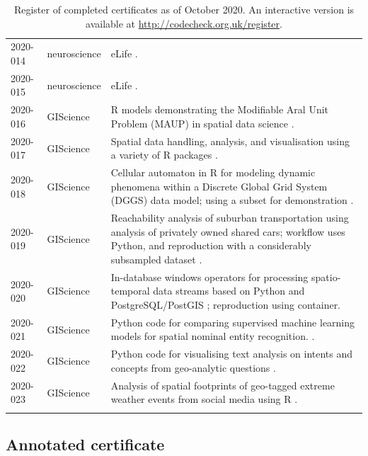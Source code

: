\documentclass[12pt]{article}
\begin{document}
\begin{table}
\begin{tabular}{llp{11cm}}
    2020-014  \cite{cert-2020-014} & neuroscience & eLife \cite{Sadeh2020}. \\
    2020-015  \cite{cert-2020-015} & neuroscience & eLife \cite{Liou2020}. \\
    2020-016  \cite{cert-2020-016} & GIScience & 
    R models demonstrating the Modifiable Aral Unit Problem (MAUP) in spatial data science \cite{Brunsdon2020}. \\
    2020-017  \cite{cert-2020-017} & GIScience & 
    Spatial data handling, analysis, and visualisation using a variety of R packages \cite{Bivand2020}. \\
    2020-018  \cite{cert-2020-018} & GIScience & 
    Cellular automaton in R for modeling dynamic phenomena within a Discrete Global Grid System (DGGS) data model; using a subset for demonstration \cite{Hojati2020}. \\
    2020-019  \cite{cert-2020-019} & GIScience & Reachability analysis of suburban transportation using analysis of privately owned shared cars; workflow uses Python, and reproduction with a considerably subsampled dataset \cite{Illium2020}. \\
    2020-020  \cite{cert-2020-020} & GIScience & In-database windows operators for processing spatio-temporal data streams based on Python and PostgreSQL/PostGIS \cite{Werner2020}; reproduction using container. \\
    2020-021  \cite{cert-2020-021} & GIScience & Python code for comparing supervised machine learning models for spatial nominal entity recognition. \cite{Medad2020}. \\
    2020-022  \cite{cert-2020-022} & GIScience & Python code for visualising text analysis on intents and concepts from geo-analytic questions \cite{Xu2020}. \\
    2020-023  \cite{cert-2020-023} & GIScience & Analysis of spatial footprints of geo-tagged extreme weather events from social media using R \cite{Owuor2020}. \\
    \\ \bottomrule
  \end{tabular}
  \caption{Register of completed certificates as of October 2020.  An interactive version
  is available at \url{http://codecheck.org.uk/register}. %
  }
  \label{tab:register}
\end{table}

\subsection*{Annotated certificate}\label{annotated-certificate}
\end{document}
